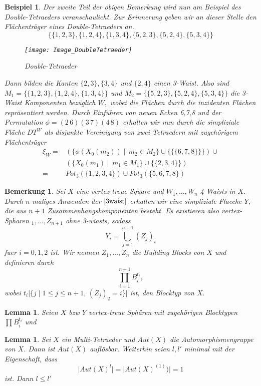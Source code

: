 \documentclass[12pt,titlepage,twoside,cleardoublepage]{article}
\theoremstyle{nummermitklammern}
\newtheorem{lemma}[temp]{Lemma}
\newtheorem{bsp}[temp]{Beispiel}
\newtheorem{bemerkung}[temp]{Bemerkung}
\newtheorem{lemma}[zahl]{Lemma}
\newtheorem{bsp}[zahl]{Beispiel}
\newtheorem{bemerkung}[zahl]{Bemerkung}
\numberwithin{equation}{section}
\begin{document}
\begin{bsp}
Der zweite Teil der obigen Bemerkung wird nun am Beispiel des Double-Tetraeders veranschaulicht.
Zur Erinnerung geben wir an dieser Stelle den Flächenträger eines Double-Tetraeders an.
\[
\{\{1,2,3\},\{1,2,4\},\{1,3,4\},\{5,2,3\},\{5,2,4\},\{5,3,4\}\}
\]
\begin{figure}[H]
\begin{center}
\texttt{[image: Image\_DoubleTetraeder]}
\end{center}
\caption{Double-Tetraeder}
\end{figure}
Dann bilden die Kanten $\{2,3\},\{3,4\}$ und $\{2,4\}$ einen 3-Waist. Also sind $M_1=\{\{1,2,3\},\{1,2,4\},\{1,3,4\}\}$ und $M_2=\{\{5,2,3\},\{5,2,4\},\{5,3,4\}\}$ die 3-Waist Komponenten bezüglich $W,$ wobei die Flächen durch die inzidenten Flächen repräsentiert werden. Durch Einführen von neuen Ecken 6,7,8 und der Permutation $\phi=(2\, 6)(3\, 7)(4\,8)$ erhalten wir nun durch die simpliziale Fläche $DT^W$ als disjunkte Vereinigung von zwei Tetraedern mit zugehörigem Flächenträger
\begin{align*}
\xi_W=&(\{\phi(X_0(m_2))\mid \, m_2\in M_2\}\cup \{\{\{6,7,8\}\}\}) \cup \\
&(\{X_0(m_1)\mid \, m_1\in M_1\}\cup \{\{2,3,4\}\})\\
=&Pot_3(\{1,2,3,4\})\cup Pot_3(\{5,6,7,8\})
\end{align*}
\end{bsp}
\begin{bemerkung}
Sei $X$ eine vertex-treue Square und $W_1,\ldots,W_n$ 4-Waists in $X.$ Durch  $n$-maliges Anwenden der $\Cref{3waist}$ erhalten wir eine simpliziale Flaeche $Y,$ die aus $n+1$ Zusammenhangskomponenten besteht. Es existieren also vertex-Spharen $_1,\ldots,Z_{n+1}$ ohne 3-wiasts, sodass
\[
Y_i=\bigcup_{j=1}^{n+1}(Z_j)_i 
\]
fuer $i=0,1,2$ ist. Wir nennen $Z_1,\ldots,Z_n$ die Building Blocks von $X$ und definieren durch 
\[
\prod_{i=1}^{n+1} B_i^{t_i},
\]
wobei $t_i\vert\{j \mid 1\leq j\leq n+1,\,(Z_j)_2=i\}\vert$ ist, den \emph{Blocktyp} von $X.$
\end{bemerkung}
\begin{lemma}
Seien $X$ bzw $Y$ vertex-treue Sphären mit zugehörigen Blocktypen $\prod B_i^{t_i}$ und 
\end{lemma}
\begin{lemma}
 Sei $X$ ein Multi-Tetraeder und $Aut(X)$ die Automorphismengruppe von $X$. Dann ist $Aut(X)$ auflösbar. Weiterhin seien $l, l'$  minimal mit der Eigenschaft, dass
 \[
\vert Aut(X)^l \vert  = \vert Aut(X)^{(1)})\vert = 1
\]
ist. Dann $l \leq l'$
\end{lemma}
\end{document}
